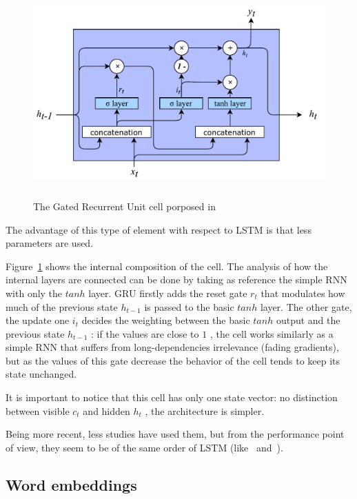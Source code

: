 \begin{figure}[!htbp]
    \centering
    \includegraphics[max width=\linewidth,max height=8cm,keepaspectratio]{figures/GRU}
    \caption{The Gated Recurrent Unit cell porposed in~\cite{cho2014learning}}\label{fig:GRU}
\end{figure}

The advantage of this type of element with respect to LSTM is that less parameters are used.

Figure~\ref{fig:GRU} shows the internal composition of the cell. The analysis of how the internal layers are connected can be done by taking as reference the simple RNN with only the  \( tanh \) layer. GRU firstly adds the reset gate  \( r_{t} \) that modulates how much of the previous state  \( h_{t-1} \) is passed to the basic  \( tanh \) layer. The other gate, the update one  \( i_{t} \) decides the weighting between the basic  \( tanh \) output and the previous state  \( h_{t-1} \) : if the values are close to  \( 1 \) , the cell works similarly as a simple RNN that suffers from long-dependencies irrelevance (fading gradients), but as the values of this gate decrease the behavior of the cell tends to keep its state unchanged.

It is important to notice that this cell has only one state vector: no distinction between visible  \( c_{t} \) and hidden  \( h_{t} \) , the architecture is simpler.

Being more recent, less studies have used them, but from the performance point of view, they seem to be of the same order of LSTM (like~\cite{jozefowicz2015empirical} and~\cite{chung2014empirical}).

\subsection{Word embeddings}
\label{soaWordEmbeddings}

